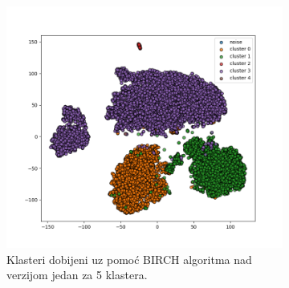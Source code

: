 \documentclass[a4paper]{article}
\begin{document}
\begin{figure}[H]
	\begin{subfigure}{0.5\textwidth}
	\centering
	\includegraphics[width=\textwidth]{birch_clustering}	
	\caption{Klasteri dobijeni uz pomoć BIRCH algoritma nad verzijom jedan za 5 klastera.}
	\label{birch_clustering}
	\end{subfigure}
	~
	\begin{subfigure}{0.5\textwidth}
	\centering

\end{subfigure}
\end{figure}
\end{document}
